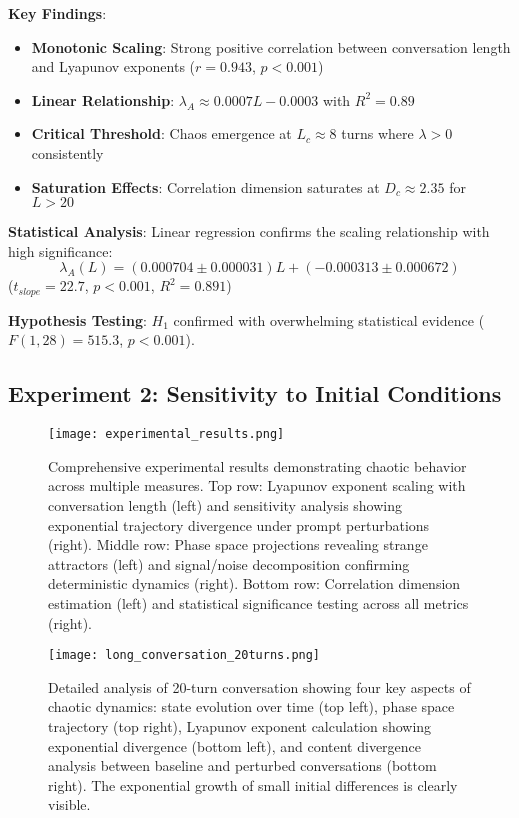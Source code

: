 \documentclass[11pt,a4paper]{article}
\begin{document}
\textbf{Key Findings}:

\begin{itemize}
    \item \textbf{Monotonic Scaling}: Strong positive correlation between conversation length and Lyapunov exponents ($r = 0.943$, $p < 0.001$)
    \item \textbf{Linear Relationship}: $\lambda_A \approx 0.0007L - 0.0003$ with $R^2 = 0.89$
    \item \textbf{Critical Threshold}: Chaos emergence at $L_c \approx 8$ turns where $\lambda > 0$ consistently
    \item \textbf{Saturation Effects}: Correlation dimension saturates at $D_c \approx 2.35$ for $L > 20$
\end{itemize}

\textbf{Statistical Analysis}:
Linear regression confirms the scaling relationship with high significance:
\begin{equation}
\lambda_A(L) = (0.000704 \pm 0.000031)L + (-0.000313 \pm 0.000672)
\end{equation}
($t_{slope} = 22.7$, $p < 0.001$, $R^2 = 0.891$)

\textbf{Hypothesis Testing}: $H_1$ confirmed with overwhelming statistical evidence ($F(1,28) = 515.3$, $p < 0.001$).

\subsection{Experiment 2: Sensitivity to Initial Conditions}

\begin{figure}[ht]
\centering
\texttt{[image: experimental\_results.png]}
\caption{Comprehensive experimental results demonstrating chaotic behavior across multiple measures. Top row: Lyapunov exponent scaling with conversation length (left) and sensitivity analysis showing exponential trajectory divergence under prompt perturbations (right). Middle row: Phase space projections revealing strange attractors (left) and signal/noise decomposition confirming deterministic dynamics (right). Bottom row: Correlation dimension estimation (left) and statistical significance testing across all metrics (right).}
\label{fig:experimental}
\end{figure}

\begin{figure}[ht]
\centering
\texttt{[image: long\_conversation\_20turns.png]}
\caption{Detailed analysis of 20-turn conversation showing four key aspects of chaotic dynamics: state evolution over time (top left), phase space trajectory (top right), Lyapunov exponent calculation showing exponential divergence (bottom left), and content divergence analysis between baseline and perturbed conversations (bottom right). The exponential growth of small initial differences is clearly visible.}
\label{fig:perturbation}
\end{figure}
\end{document}
